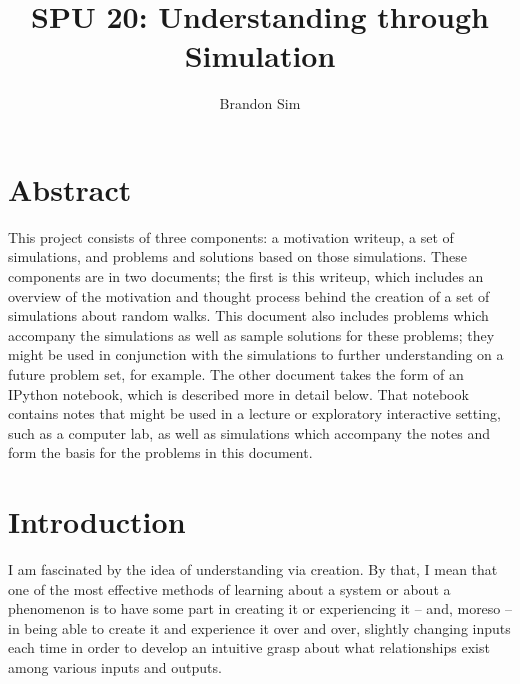 \documentclass[12pt]{article}
\begin{document}
\title{SPU 20: Understanding through Simulation}
\author{Brandon Sim}
\date{}
\maketitle

\section{Abstract}
This project consists of three components: a motivation writeup, a set of simulations, and problems and solutions based on those simulations. These components are in two documents; the first is this writeup, which includes an overview of the motivation and thought process behind the creation of a set of simulations about random walks. This document also includes problems which accompany the simulations as well as sample solutions for these problems; they might be used in conjunction with the simulations to further understanding on a future problem set, for example. The other document takes the form of an IPython notebook, which is described more in detail below. That notebook contains notes that might be used in a lecture or exploratory interactive setting, such as a computer lab, as well as simulations which accompany the notes and form the basis for the problems in this document.

\section{Introduction}
I am fascinated by the idea of understanding via creation. By that, I mean that one of the most effective methods of learning about a system or about a phenomenon is to have some part in creating it or experiencing it -- and, moreso -- in being able to create it and experience it over and over, slightly changing inputs each time in order to develop an intuitive grasp about what relationships exist among various inputs and outputs.\\
\end{document}
